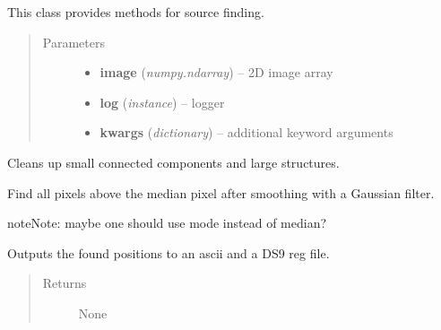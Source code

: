 \documentclass[a4paper,12pt,english]{sphinxmanual}
\begin{document}
\begin{fulllineitems}
\label{analysis:analysis.sourceFinder.sourceFinder}
This class provides methods for source finding.
\begin{quote}\begin{description}
\item[{Parameters}] \leavevmode\begin{itemize}
\item {} 
\textbf{image} (\emph{numpy.ndarray}) -- 2D image array

\item {} 
\textbf{log} (\emph{instance}) -- logger

\item {} 
\textbf{kwargs} (\emph{dictionary}) -- additional keyword arguments

\end{itemize}

\end{description}\end{quote}

\begin{fulllineitems}
\label{analysis:analysis.sourceFinder.sourceFinder.cleanSample}
Cleans up small connected components and large structures.

\end{fulllineitems}


\begin{fulllineitems}
\label{analysis:analysis.sourceFinder.sourceFinder.find}
Find all pixels above the median pixel after smoothing with a Gaussian filter.

\begin{notice}{note}{Note:}
maybe one should use mode instead of median?
\end{notice}

\end{fulllineitems}


\begin{fulllineitems}
\label{analysis:analysis.sourceFinder.sourceFinder.generateOutput}
Outputs the found positions to an ascii and a DS9 reg file.
\begin{quote}\begin{description}
\item[{Returns}] \leavevmode
None


\end{description}
\end{quote}
\end{fulllineitems}
\end{fulllineitems}
\end{document}
